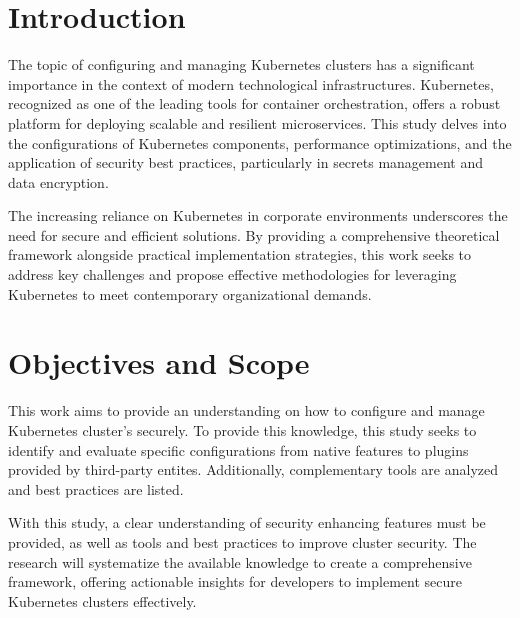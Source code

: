 \documentclass[a4paper,11pt,openright,BCOR=15mm]{scrbook}
\begin{document}
	\cleardoublepage
	

	
	
	
	\tableofcontents
	\listoffigures
	
	
	
	
	\mainmatter 
	
	

	\chapter{Introduction}

The topic of configuring and managing Kubernetes clusters has a significant importance in the context of modern technological infrastructures. Kubernetes, recognized as one of the leading tools for container orchestration, offers a robust platform for deploying scalable and resilient microservices. This study delves into the configurations of Kubernetes components, performance optimizations, and the application of security best practices, particularly in secrets management and data encryption.

The increasing reliance on Kubernetes in corporate environments underscores the need for secure and efficient solutions. By providing a comprehensive theoretical framework alongside practical implementation strategies, this work seeks to address key challenges and propose effective methodologies for leveraging Kubernetes to meet contemporary organizational demands.

	
	\chapter{Objectives and Scope}

This work aims to provide an understanding on how to configure and manage Kubernetes cluster's securely. To provide this knowledge, this study seeks to identify and evaluate specific configurations from native features to plugins provided by third-party entites. Additionally, complementary tools are analyzed and best practices are listed.

With this study, a clear understanding of security enhancing features must be provided, as well as tools and best practices to improve cluster security. The research will systematize the available knowledge to create a comprehensive framework, offering actionable insights for developers to implement secure Kubernetes clusters effectively.
\end{document}
